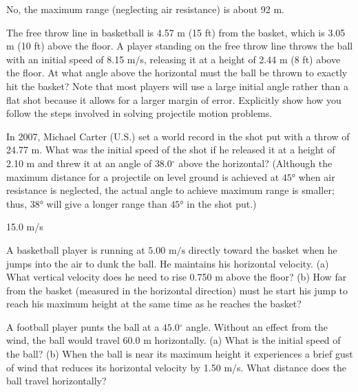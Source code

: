 \documentclass[
]{book}
\begin{document}
\leavevmode{}%
No, the maximum range (neglecting air resistance) is about 92 m.

\hypertarget{fs-id1437858}{}
\leavevmode{}%
The free throw line in basketball is 4.57 m (15 ft) from the basket,
which is 3.05 m (10 ft) above the floor. A player standing on the free
throw line throws the ball with an initial speed of 8.15 m/s, releasing
it at a height of 2.44 m (8 ft) above the floor. At what angle above the
horizontal must the ball be thrown to exactly hit the basket? Note that
most players will use a large initial angle rather than a flat shot
because it allows for a larger margin of error. Explicitly show how you
follow the steps involved in solving projectile motion problems.

\hypertarget{fs-id1827481}{}
\leavevmode{}%
In 2007, Michael Carter (U.S.) set a world record in the shot put with a
throw of 24.77 m. What was the initial speed of the shot if he released
it at a height of 2.10 m and threw it at an angle of \(38.0{^\circ}{}\)
above the horizontal? (Although the maximum distance for a projectile on
level ground is achieved at \(\text{45°}{}\) when air resistance is
neglected, the actual angle to achieve maximum range is smaller; thus,
\(\text{38°}{}\) will give a longer range than \(\text{45°}{}\) in the shot
put.)

\leavevmode{}%
15.0 m/s

\hypertarget{fs-id1670278}{}
\leavevmode{}%
A basketball player is running at \({5\text{.}\text{00~m/s}}{}\) directly
toward the basket when he jumps into the air to dunk the ball. He
maintains his horizontal velocity. (a) What vertical velocity does he
need to rise 0.750 m above the floor? (b) How far from the basket
(measured in the horizontal direction) must he start his jump to reach
his maximum height at the same time as he reaches the basket?

\hypertarget{fs-id1779635}{}
\leavevmode{}%
A football player punts the ball at a \(45.0{^\circ}{}\) angle. Without an
effect from the wind, the ball would travel 60.0 m horizontally. (a)
What is the initial speed of the ball? (b) When the ball is near its
maximum height it experiences a brief gust of wind that reduces its
horizontal velocity by 1.50 m/s. What distance does the ball travel
horizontally?
\end{document}
